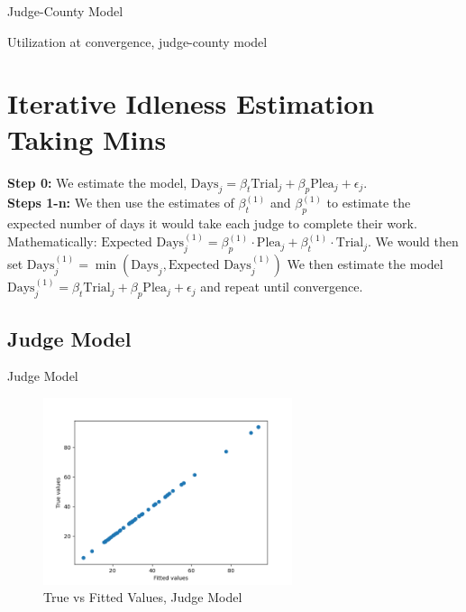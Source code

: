 \documentclass[11pt]{article}
\begin{document}
    \begin{table}[H]
      \centering
      \caption{Judge-County Model}
      
    \end{table}

    \begin{table}[H]
      \centering
      \small
      \caption{Utilization at convergence, judge-county model}
      
    \end{table}

\section{Iterative Idleness Estimation Taking Mins}
  \textbf{Step 0:} We estimate the model, $\text{Days}_j = \beta_t\text{Trial}_j + \beta_p\text{Plea}_j +\epsilon_j$. \\

  \noindent \textbf{Steps 1-n:} We then use the estimates of $\beta^{(1)}_t$ and $\beta^{(1)}_p$ to estimate the expected number
  of days it would take each judge to complete their work. Mathematically: $\text{Expected Days}^{(1)}_j = \beta^{(1)}_p \cdot \text{Plea}_j + \beta^{(1)}_t \cdot \text{Trial}_j$.
  We would then set $\text{Days}^{(1)}_j = \min(\text{Days}_j,\text{Expected Days}^{(1)}_j)$ We then estimate the model $\text{Days}^{(1)}_j = \beta_t\text{Trial}_j + \beta_p\text{Plea}_j +\epsilon_j$ and repeat until convergence.

  \subsection{Judge Model}

    \begin{table}[H]
      \centering
      \caption{Judge Model}
      
    \end{table}

    \begin{figure}[H]
      \centering
      \includegraphics[width=0.65\textwidth]{../../../output/figures/Exploration/fit_utilization_JudgeID}
      \caption{True vs Fitted Values, Judge Model}
    \end{figure}
\end{document}

